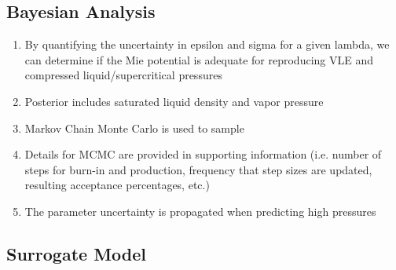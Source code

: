 \documentclass[journal=jctc,manuscript=article]{achemso}
\begin{document}
\subsection{Bayesian Analysis} \label{Bayesian Analysis}

\begin{enumerate}
	\item By quantifying the uncertainty in epsilon and sigma for a given lambda, we can determine if the Mie potential is adequate for reproducing VLE and compressed liquid/supercritical pressures
	\item Posterior includes saturated liquid density and vapor pressure
	\item Markov Chain Monte Carlo is used to sample %
	\item Details for MCMC are provided in supporting information (i.e. number of steps for burn-in and production, frequency that step sizes are updated, resulting acceptance percentages, etc.)
	\item The parameter uncertainty is propagated when predicting high pressures
\end{enumerate}

\subsection{Surrogate Model} \label{Surrogate Model}
\end{document}
